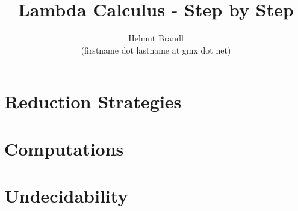 \documentclass{article}
\begin{document}


\title{Lambda Calculus - Step by Step}
\author{Helmut Brandl \\ \scriptsize (firstname dot lastname at gmx dot net)}
\date{}


\maketitle

\tableofcontents












\section{Reduction Strategies}

\section{Computations}

\section{Undecidability}



\end{document}
